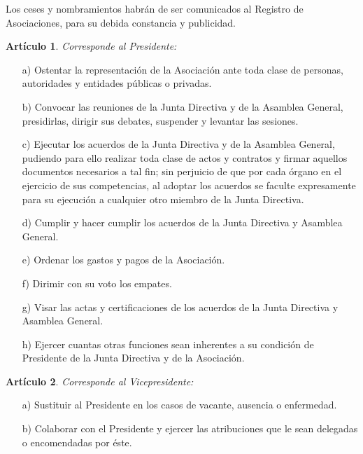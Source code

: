 \documentclass[a4paper,12pt]{article}
\theoremstyle{mystyle}		%
\newtheorem{art}{Artículo}	%
\begin{document}
\begin{onehalfspace}
Los ceses y nombramientos habrán de ser comunicados al Registro de Asociaciones, para su debida constancia y publicidad.

\begin{art}
Corresponde al Presidente:
\end{art}
\begin{itemize}
\item [a)] Ostentar la representación de la Asociación ante toda clase de personas, autoridades y entidades públicas o privadas.
\item [b)] Convocar las reuniones de la Junta Directiva y de la Asamblea General, presidirlas, dirigir sus debates, suspender y levantar las sesiones.
\item [c)] Ejecutar los acuerdos de la Junta Directiva y de la Asamblea General, pudiendo para ello realizar toda clase de actos y contratos y firmar aquellos documentos necesarios a tal fin; sin perjuicio de que por cada órgano en el ejercicio de sus competencias, al adoptar los acuerdos se faculte expresamente para su ejecución a cualquier otro miembro de la Junta Directiva.
\item [d)] Cumplir y hacer cumplir los acuerdos de la Junta Directiva y Asamblea General.
\item [e)] Ordenar los gastos y pagos de la Asociación.
\item [f)] Dirimir con su voto los empates.
\item [g)] Visar las actas y certificaciones de los acuerdos de la Junta Directiva y Asamblea General.
\item [h)] Ejercer cuantas otras funciones sean inherentes a su condición de Presidente de la Junta Directiva y de la Asociación.
\end{itemize}

\begin{art}
Corresponde al Vicepresidente:
\end{art}
\begin{itemize}
\item [a)]  Sustituir al Presidente en los casos de vacante, ausencia o enfermedad.
\item [b)]  Colaborar con el Presidente y ejercer las atribuciones que le sean delegadas o encomendadas por éste.
\end{itemize}


\end{onehalfspace}
\end{document}
